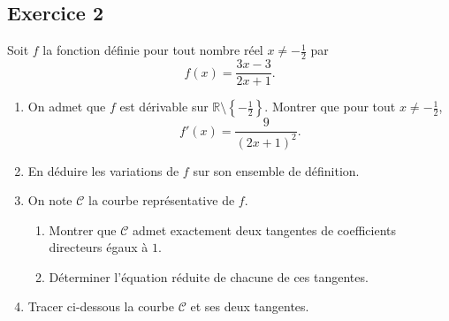 \documentclass[a4paper,12pt]{article}
\begin{document}
\newpage

\subsection*{Exercice 2}

Soit $f$ la fonction définie pour tout nombre réel $x \neq -\frac{1}{2}$ par
\[
f(x) = \frac{3x - 3}{2x + 1}.
\]

\begin{enumerate}
\item On admet que $f$ est dérivable sur $\mathbb{R}\setminus\left\{-\frac{1}{2}\right\}$. Montrer que pour tout $x \neq -\frac{1}{2}$,
\[
f'(x) = \frac{9}{(2x+1)^2}.
\]

\item En déduire les variations de $f$ sur son ensemble de définition.

\item On note $\mathcal{C}$ la courbe représentative de $f$.
\begin{enumerate}
\item Montrer que $\mathcal{C}$ admet exactement deux tangentes de coefficients directeurs égaux à $1$.
\item Déterminer l'équation réduite de chacune de ces tangentes.
\end{enumerate}

\item Tracer ci-dessous la courbe $\mathcal{C}$ et ses deux tangentes.

\begin{center}
\end{center}

\end{enumerate}
\end{document}
